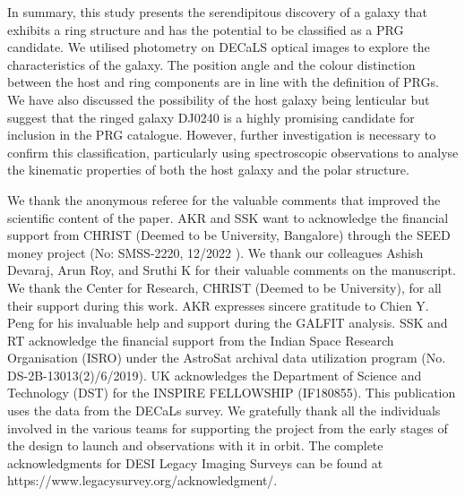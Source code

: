 \documentclass{aa}
\begin{document}
In summary, this study presents the serendipitous discovery of a galaxy that exhibits a ring structure and has the potential to be classified as a PRG candidate. We utilised photometry on DECaLS optical images to explore the characteristics of the galaxy. The position angle and the colour distinction between the host and ring components are in line with the definition of PRGs. We have also discussed the possibility of the host galaxy being lenticular but suggest that the ringed galaxy DJ0240 is a highly promising candidate for inclusion in the PRG catalogue. However, further investigation is necessary to confirm this classification, particularly using spectroscopic observations to analyse the kinematic properties of both the host galaxy and the polar structure. 
\begin{acknowledgements}
We thank the anonymous referee for the valuable comments that improved the scientific content of the paper. AKR and SSK want to acknowledge the financial support from CHRIST (Deemed to be University, Bangalore) through the SEED money project (No: SMSS-2220, 12/2022 ). We thank our colleagues Ashish Devaraj, Arun Roy, and Sruthi K for their valuable comments on the manuscript.  We thank the Center for Research, CHRIST (Deemed to be University), for all their support during this work. AKR expresses sincere gratitude to Chien Y. Peng for his invaluable help and support during the GALFIT analysis. SSK and RT acknowledge the financial support from the Indian Space Research Organisation (ISRO) under the AstroSat archival data utilization program
(No. DS-2B-13013(2)/6/2019). UK acknowledges the Department of Science and Technology (DST) for the INSPIRE FELLOWSHIP (IF180855). This publication uses the data from the DECaLs survey. We gratefully thank all the individuals involved in the various teams for supporting the project from the early stages of the design to launch and observations with it in orbit. The complete acknowledgments for DESI Legacy Imaging Surveys can be found at https://www.legacysurvey.org/acknowledgment/.
\end{acknowledgements}

 
\end{document}
